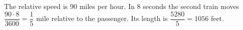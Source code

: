 The relative speed is 90 miles per hour. In 8 seconds the second train moves $\dfrac{90\cdot8}{3600}=\dfrac{1}{5}$ mile relative to the passenger. Its length is $\dfrac{5280}{5}=\boxed{1056\text{ feet}}$.
